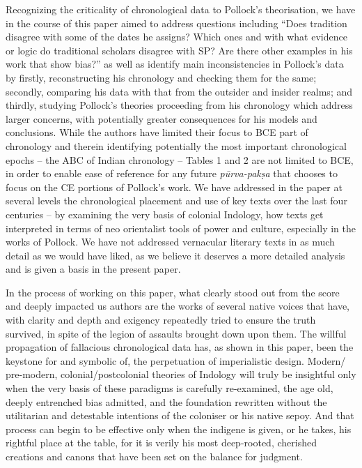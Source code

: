 Recognizing the criticality of chronological data to Pollock’s theorisation, we have in the course of this paper aimed to address questions including “Does tradition disagree with some of the dates he assigns? Which ones and with what evidence or logic do traditional scholars disagree with SP? Are there other examples in his work that show bias?” as well as identify main inconsistencies in Pollock’s data by firstly, reconstructing his chronology and checking them for the same; secondly, comparing his data with that from the outsider and insider realms; and thirdly, studying Pollock’s theories proceeding from his chronology which address larger concerns, with potentially greater consequences for his models and conclusions. While the authors have limited their focus to BCE part of chronology and therein identifying potentially the most important chronological epochs – the ABC of Indian chronology – Tables 1 and 2 are not limited to BCE, in order to enable ease of reference for any future \textit{pūrva-pakṣa} that chooses to focus on the CE portions of Pollock’s work. We have addressed in the paper at several levels the chronological placement and use of key texts over the last four centuries – by examining the very basis of colonial Indology, how texts get interpreted in terms of neo orientalist tools of power and culture, especially in the works of Pollock. We have not addressed vernacular literary texts in as much detail as we would have liked, as we believe it deserves a more detailed analysis and is given a basis in the present paper.

In the process of working on this paper, what clearly stood out from the score and deeply impacted us authors are the works of several native voices that have, with clarity and depth and exigency repeatedly tried to ensure the truth survived, in spite of the legion of assaults brought down upon them. The willful propagation of fallacious chronological data has, as shown in this paper, been the keystone for and symbolic of, the perpetuation of imperialistic design. Modern/ pre-modern, colonial/postcolonial theories of Indology will truly be insightful only when the very basis of these paradigms is carefully re-examined, the age old, deeply entrenched bias admitted, and the foundation rewritten without the utilitarian and detestable intentions of the coloniser or his native sepoy. And that process can begin to be effective only when the indigene is given, or he takes, his rightful place at the table, for it is verily his most deep-rooted, cherished creations and canons that have been set on the balance for judgment.


